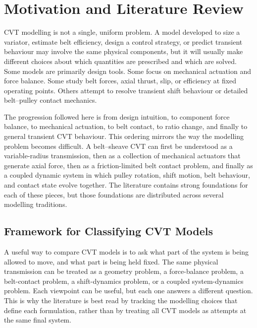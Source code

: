 \documentclass[11pt]{report}
\numberwithin{equation}{section}
\begin{document}
\section{Motivation and Literature Review}
\label{sec:literature-review}

CVT modelling is not a single, uniform problem. A model developed to size a variator, estimate belt efficiency, design a control strategy, or predict transient behaviour may involve the same physical components, but it will usually make different choices about which quantities are prescribed and which are solved. Some models are primarily design tools. Some focus on mechanical actuation and force balance. Some study belt forces, axial thrust, slip, or efficiency at fixed operating points. Others attempt to resolve transient shift behaviour or detailed belt--pulley contact mechanics.

The progression followed here is from design intuition, to component force balance, to mechanical actuation, to belt contact, to ratio change, and finally to general transient CVT behaviour. This ordering mirrors the way the modelling problem becomes difficult. A belt--sheave CVT can first be understood as a variable-radius transmission, then as a collection of mechanical actuators that generate axial force, then as a friction-limited belt contact problem, and finally as a coupled dynamic system in which pulley rotation, shift motion, belt behaviour, and contact state evolve together. The literature contains strong foundations for each of these pieces, but those foundations are distributed across several modelling traditions.

\subsection{Framework for Classifying CVT Models}
\label{sec:lit-classification}

A useful way to compare CVT models is to ask what part of the system is being allowed to move, and what part is being held fixed. The same physical transmission can be treated as a geometry problem, a force-balance problem, a belt-contact problem, a shift-dynamics problem, or a coupled system-dynamics problem. Each viewpoint can be useful, but each one answers a different question. This is why the literature is best read by tracking the modelling choices that define each formulation, rather than by treating all CVT models as attempts at the same final system.
\end{document}
